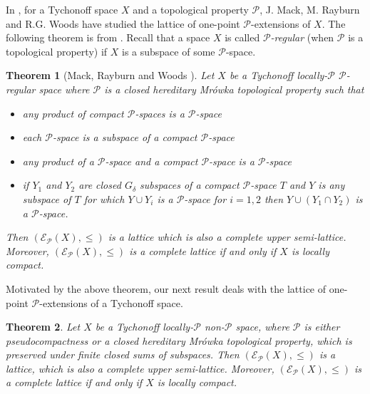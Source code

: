\documentclass{amsart}
\newtheorem{theorem}{Theorem}[section]
\theoremstyle{definition}
\theoremstyle{remark}
\theoremstyle{notation}
\numberwithin{equation}{section}
\begin{document}
In \cite{MRW1}, for a Tychonoff space $X$ and a topological property ${\mathcal P}$, J. Mack, M. Rayburn and R.G.  Woods have studied the lattice of one-point ${\mathcal P}$-extensions of $X$. The following theorem is from \cite{MRW1}. Recall that  a space $X$ is called
{\em ${\mathcal P}$-regular} (when ${\mathcal P}$ is a  topological property) if $X$ is a subspace of some ${\mathcal P}$-space.

\begin{theorem}[Mack, Rayburn and Woods \cite{MRW1}]\label{HGGKH}
Let $X$ be a Tychonoff locally-${\mathcal P}$ ${\mathcal P}$-regular space where ${\mathcal P}$ is a closed  hereditary Mr\'{o}wka topological property such that
\begin{itemize}
\item[\rm(1)] any product of compact ${\mathcal P}$-spaces is a  ${\mathcal P}$-space
\item[\rm(2)] each ${\mathcal P}$-space is a subspace of a compact ${\mathcal P}$-space
\item[\rm(3)] any product of a ${\mathcal P}$-space and a compact ${\mathcal P}$-space is a  ${\mathcal P}$-space
\item[\rm(4)] if $Y_1$ and $Y_2$ are closed $G_\delta$ subspaces of a compact ${\mathcal P}$-space $T$ and $Y$ is any subspace of $T$ for which $Y\cup Y_i$ is a ${\mathcal P}$-space for $i=1,2$ then $Y\cup(Y_1\cap Y_2)$ is a  ${\mathcal P}$-space.
\end{itemize}
Then $({\mathscr E}_{{\mathcal P}}(X),\leq)$ is a lattice which is also a complete upper semi-lattice. Moreover,
$({\mathscr E}_{{\mathcal P}}(X),\leq)$ is a complete lattice if and only if $X$ is locally compact.
\end{theorem}

Motivated by the above theorem, our next result deals with the lattice of one-point ${\mathcal P}$-extensions of a Tychonoff  space.

\begin{theorem}\label{GKH}
Let $X$ be a Tychonoff locally-${\mathcal P}$ non-${\mathcal P}$ space, where  ${\mathcal P}$ is  either pseudocompactness or a  closed  hereditary
Mr\'{o}wka topological  property, which is preserved under finite closed sums of subspaces. Then
$({\mathscr E}_{{\mathcal P}}(X),\leq)$ is a lattice, which is also a complete upper semi-lattice. Moreover,  $({\mathscr E}_{{\mathcal P}}(X),\leq)$
is a complete lattice if and only if $X$ is locally compact.
\end{theorem}
\end{document}
